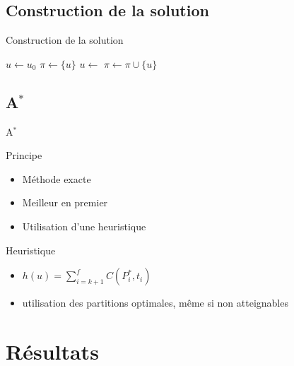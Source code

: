 \documentclass[tikz]{beamer}
\begin{document}
\subsection{Construction de la solution}
\begin{frame}[c]{Construction de la solution}
  \begin{algorithmic}
    \State{}\(u \gets u_0\)
    \State{}\(\pi \gets \{u\}\)
    \State{}
    \State{}\(u \gets\) 
    \State{}\(\pi \gets \pi \cup \{u\}\)
    \EndFor{}
    \State{}\Return{$\pi$}
    \EndFunction{}
  \end{algorithmic}
\end{frame}

\subsection{A\(^*\)}
\begin{frame}[c]{A\(^*\)}
  \begin{block}{Principe}
    \begin{itemize}
      \item Méthode exacte
      \item Meilleur en premier
      \item Utilisation d'une heuristique
    \end{itemize}
  \end{block}
  \begin{block}{Heuristique}
    \begin{itemize}
      \item \(h(u) = \sum_{i=k+1}^f C(P^*_i, t_i)\)
      \item utilisation des partitions optimales, même si non atteignables
    \end{itemize}
  \end{block}
\end{frame}

\section{Résultats}
\end{document}
